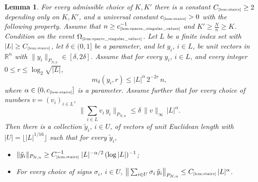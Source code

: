 \documentclass[11pt]{amsart}
\newtheorem{lemma}[theorem]{Lemma}
\theoremstyle{definition}
\theoremstyle{plain}
\newcommand{\R}{\mathbb{R}}
\def\R{{\mathbb R}}
\begin{document}
\begin{lemma}\label{lem:stairs}
For every admissible choice of $K,K'$
there is a constant
$C_{\text{\tiny\ref{lem:stairs}}}\geq 2$
depending only on $K,K'$,
and a {\it universal constant} $c_{\text{\tiny\ref{lem:stairs}}}>0$
with the following property.
Assume that $n\geq c_{\text{\tiny\ref{lem:sparse_singular_values}}}^{-1}$
and $K'\geq \frac{N}{n}\geq K$.
Condition on the event
$\Omega_{\text{\tiny\ref{lem:sparse_singular_values}}}$.
Let $L$ be a finite index set
with $|L|\geq C_{\text{\tiny\ref{lem:stairs}}}$,
let $\delta\in(0,1]$ be a parameter,
and let $y_i$, $i\in L$, be
unit vectors in $\R^n$ with $\|y_i\|_{P_{N,n}}\in [\delta,2\delta]$.
Assume that 
for every $y_i$, $i\in L$, and every integer
$0\leq r\leq \log_2 \sqrt{|L|}$,
$$
m_\delta(y_i,r)\leq |L|^{\alpha}\,2^{-2r}\,n,
$$
where $\alpha\in(0,c_{\text{\tiny\ref{lem:stairs}}}]$
is a parameter.
Assume further that for every 
choice of numbers $v=(v_i)_{i\in L}$,
$$
\Big\|\sum_{i\in L}v_i\,y_i\Big\|_{P_{N,n}}
\leq \delta\,\|v\|_\infty\,|L|^{\alpha}.
$$
Then there is a collection $\tilde y_i$, $i\in U$,
of vectors of unit Euclidean length
with $|U|=\big\lfloor |L|^{1/16}\big\rfloor$ such that for every $\tilde y_i$,
\begin{itemize}
    \item $\|\tilde y_i\|_{P_{N,n}}\geq
    C_{\text{\tiny\ref{lem:stairs}}}^{-1}\;|L|^{-\alpha/2}\,
    (\log |L|)^{-1}$;
    \item For every choice of signs $\sigma_i$, $i\in U$, $\big\|
    \sum_{i\in U}\sigma_i\,\tilde y_i
    \big\|_{P_{N,n}}\leq C_{\text{\tiny\ref{lem:stairs}}}\,|L|^{\alpha}$.
\end{itemize}
\end{lemma}
\end{document}
